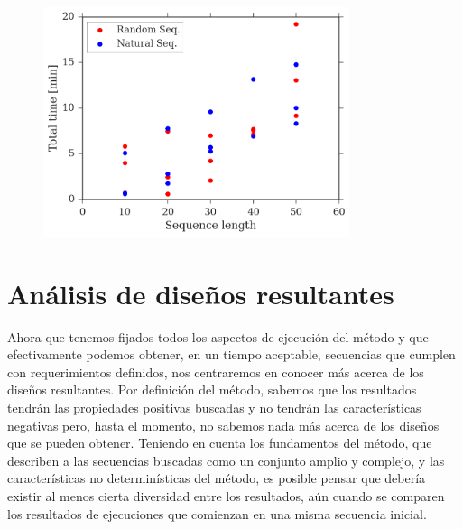 \begin{figure}[htbp]
\centering
\includegraphics[width=0.8\textwidth]{img/resultados/lengthVsTime.png}
\caption{}
\label{fig:time-vs-length}
\end{figure}





\section{Análisis de diseños resultantes}

Ahora que tenemos fijados todos los aspectos de ejecución del método y que efectivamente podemos obtener, en un tiempo aceptable, secuencias que cumplen con requerimientos definidos, nos centraremos en 
conocer más acerca de los diseños resultantes.
Por definición del método, sabemos que los resultados tendrán las propiedades positivas buscadas y no tendrán las características negativas pero, hasta el momento, no sabemos nada más acerca de los diseños que se pueden obtener.
Teniendo en cuenta los fundamentos del método, que describen a las secuencias buscadas como un conjunto amplio y complejo, y las características no determinísticas del método,
es posible pensar que debería existir al menos cierta diversidad entre los resultados, aún cuando se comparen los resultados de ejecuciones que comienzan en una misma secuencia inicial.

